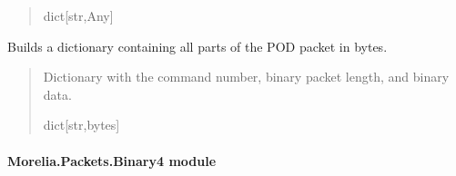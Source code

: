 \documentclass[letterpaper,10pt,english]{sphinxmanual}
\begin{document}
\begin{fulllineitems}
\begin{fulllineitems}
\begin{quote}
\begin{description}
\sphinxAtStartPar
dict{[}str,Any{]}

\end{description}\end{quote}

\end{fulllineitems}


\begin{fulllineitems}
\label{\detokenize{Morelia.Packets:Morelia.Packets.Binary.PacketBinary.UnpackAll}}
\pysigstartsignatures
{}
\pysigstopsignatures
\sphinxAtStartPar
Builds a dictionary containing all parts of the POD packet in bytes.
\begin{quote}\begin{description}
\sphinxAtStartPar
Dictionary with the command number, binary packet length,                 and binary data.

\sphinxAtStartPar
dict{[}str,bytes{]}

\end{description}\end{quote}

\end{fulllineitems}


\end{fulllineitems}



\paragraph{Morelia.Packets.Binary4 module}
\label{\detokenize{Morelia.Packets:module-Morelia.Packets.Binary4}}\label{\detokenize{Morelia.Packets:morelia-packets-binary4-module}}
\end{document}
